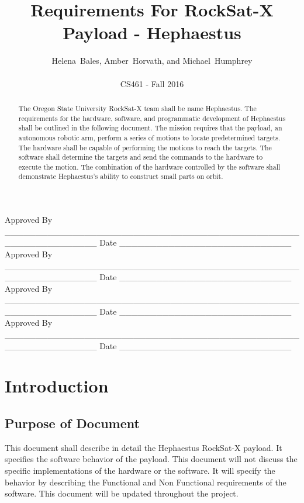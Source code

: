 \documentclass[letterpaper,10pt]{article}
\title{Requirements For RockSat-X Payload - Hephaestus}
\author{Helena~Bales, Amber~Horvath, and Michael~Humphrey\\ \\ CS461 - Fall 2016}
\newenvironment{bottompar}{\par\vspace*{\fill}}{\clearpage}
\begin{document}
\maketitle

\begin{abstract}
The Oregon State University RockSat-X team shall be name Hephaestus.
The requirements for the hardware, software, and programmatic development of Hephaestus shall be outlined in the following document.
The mission requires that the payload, an autonomous robotic arm, perform a series of motions to locate predetermined targets.
The hardware shall be capable of performing the motions to reach the targets.
The software shall determine the targets and send the commands to the hardware to execute the motion.
The combination of the hardware controlled by the software shall demonstrate Hephaestus's ability to construct small parts on orbit.
\end{abstract}

\begin{bottompar}
Approved By
\_\_\_\_\_\_\_\_\_\_\_\_\_\_\_\_\_\_\_\_\_\_\_\_\_\_\_\_\_\_\_\_\_\_\_\_\_\_\_\_\_\_\_\_\_\_\_\_\_\_\_\_\_\_\_\_\_\_\_\_\_\_\_
Date \_\_\_\_\_\_\_\_\_\_\_\_\_\_\_\_\_\_\_\_\_\_\_\_\_\_\_\_ \\
Approved By
\_\_\_\_\_\_\_\_\_\_\_\_\_\_\_\_\_\_\_\_\_\_\_\_\_\_\_\_\_\_\_\_\_\_\_\_\_\_\_\_\_\_\_\_\_\_\_\_\_\_\_\_\_\_\_\_\_\_\_\_\_\_\_
Date \_\_\_\_\_\_\_\_\_\_\_\_\_\_\_\_\_\_\_\_\_\_\_\_\_\_\_\_ \\
Approved By
\_\_\_\_\_\_\_\_\_\_\_\_\_\_\_\_\_\_\_\_\_\_\_\_\_\_\_\_\_\_\_\_\_\_\_\_\_\_\_\_\_\_\_\_\_\_\_\_\_\_\_\_\_\_\_\_\_\_\_\_\_\_\_
Date \_\_\_\_\_\_\_\_\_\_\_\_\_\_\_\_\_\_\_\_\_\_\_\_\_\_\_\_ \\
Approved By
\_\_\_\_\_\_\_\_\_\_\_\_\_\_\_\_\_\_\_\_\_\_\_\_\_\_\_\_\_\_\_\_\_\_\_\_\_\_\_\_\_\_\_\_\_\_\_\_\_\_\_\_\_\_\_\_\_\_\_\_\_\_\_
Date \_\_\_\_\_\_\_\_\_\_\_\_\_\_\_\_\_\_\_\_\_\_\_\_\_\_\_\_ \\
\end{bottompar}

\clearpage
\tableofcontents
\clearpage

\section{Introduction}
\subsection{Purpose of Document}
This document shall describe in detail the Hephaestus RockSat-X payload.
It specifies the software behavior of the payload.
This document will not discuss the specific implementations of the hardware or the software.
It will specify the behavior by describing the Functional and Non Functional requirements of the software.
This document will be updated throughout the project.
\end{document}
